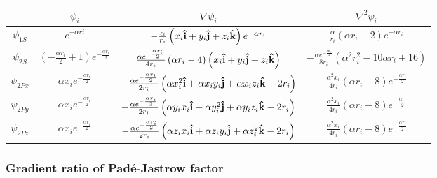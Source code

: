 \documentclass[11pt]{article}
\begin{document}
			\begin{center}
				\begin{tabular}{| c | c | c | c |}
				\bottomrule
				& \( \psi_i\)	& \( \nabla\psi_i \) & \( \nabla^2\psi_i \)
				\\ \hline
					\(\psi_{1S}\)
					&
					\( e^{- \alpha ri} \)
					&
					\( - \frac{\alpha}{r_{i}} \left(x_{i}\vu{i} + y_{i}\vu{j} + z_{i}\vu{k}\right) e^{- \alpha r_{i}} \)
					&
					\(\frac{\alpha}{r_{i}} \left(\alpha r_{i} - 2\right) e^{- \alpha r_{i}} \)
				\\	\hline
					\(\psi_{2S}\)
					&
					\( \left(- \frac{\alpha r_{i}}{2} + 1\right) e^{- \frac{\alpha r_{i}}{2}} \)
					&
					\( \frac{\alpha e^{- \frac{\alpha r_{i}}{2}}}{4 r_{i}} \left(\alpha r_{i} - 4\right) \left(x_{i}\vu{i} + y_{i}\vu{j} + z_{i}\vu{k}\right) \)
					&
					\( - \frac{\alpha e^{- \frac{\alpha r_{i}}{2}}}{8 r_{i}} \left(\alpha^{2} r_{i}^{2} - 10 \alpha r_{i} + 16\right) \)
				\\	\hline
					\(\psi_{2Px}\)
					&
					\( \alpha x_{i} e^{- \frac{\alpha r_{i}}{2}} \)
					&
					\( - \frac{\alpha e^{- \frac{\alpha r_{i}}{2}}}{2 r_{i}} \left(\alpha x_{i}^{2}\vu{i} + \alpha x_{i} y_{i}\vu{j} + \alpha x_{i} z_{i}\vu{k} - 2 r_{i}\right) \)
					&
					\( \frac{\alpha^{2} x_{i}}{4 r_{i}} \left(\alpha r_{i} - 8\right) e^{- \frac{\alpha r_{i}}{2}} \)
				\\	\hline
					\(\psi_{2Py}\)
					&
					\( \alpha x_{i} e^{- \frac{\alpha r_{i}}{2}} \)
					&
					\( - \frac{\alpha e^{- \frac{\alpha r_{i}}{2}}}{2 r_{i}} \left(\alpha y_{i} x_{i}\vu{i} + \alpha y_{i}^{2}\vu{j} + \alpha y_{i} z_{i}\vu{k} - 2 r_{i}\right) \)
					&
					\( \frac{\alpha^{2} x_{i}}{4 r_{i}} \left(\alpha r_{i} - 8\right) e^{- \frac{\alpha r_{i}}{2}} \)
				\\	\hline
					\(\psi_{2Pz}\)
					&
					\( \alpha x_{i} e^{- \frac{\alpha r_{i}}{2}} \)
					&
					\( - \frac{\alpha e^{- \frac{\alpha r_{i}}{2}}}{2 r_{i}} \left(\alpha z_{i} x_{i}\vu{i} + \alpha z_{i} y_{i}\vu{j} + \alpha z_{i}^{2}\vu{k} - 2 r_{i}\right) \)
					&
					\( \frac{\alpha^{2} x_{i}}{4 r_{i}} \left(\alpha r_{i} - 8\right) e^{- \frac{\alpha r_{i}}{2}} \)
				\\ \toprule
				\end{tabular}
			\end{center}

		\subsubsection{ Gradient ratio of  Padé-Jastrow factor }
\end{document}
